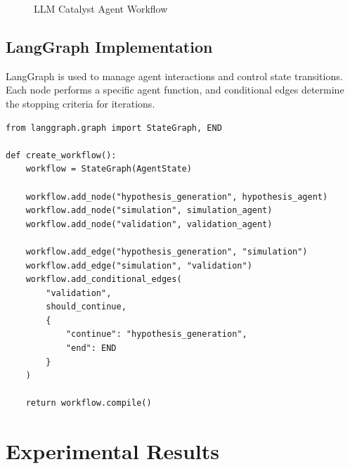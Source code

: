 \begin{figure}[H]
    \centering
    \caption{LLM Catalyst Agent Workflow}
    \label{fig:workflow}
\end{figure}

\subsection{LangGraph Implementation}

LangGraph is used to manage agent interactions and control state transitions. Each node performs a specific agent function, and conditional edges determine the stopping criteria for iterations.

\begin{listing}[H]
\begin{verbatim}
from langgraph.graph import StateGraph, END

def create_workflow():
    workflow = StateGraph(AgentState)
    
    workflow.add_node("hypothesis_generation", hypothesis_agent)
    workflow.add_node("simulation", simulation_agent)
    workflow.add_node("validation", validation_agent)
    
    workflow.add_edge("hypothesis_generation", "simulation")
    workflow.add_edge("simulation", "validation")
    workflow.add_conditional_edges(
        "validation",
        should_continue,
        {
            "continue": "hypothesis_generation",
            "end": END
        }
    )
    
    return workflow.compile()
\end{verbatim}
\caption{LangGraph Workflow Implementation}
\label{lst:langgraph_workflow}
\end{listing}

\section{Experimental Results}

